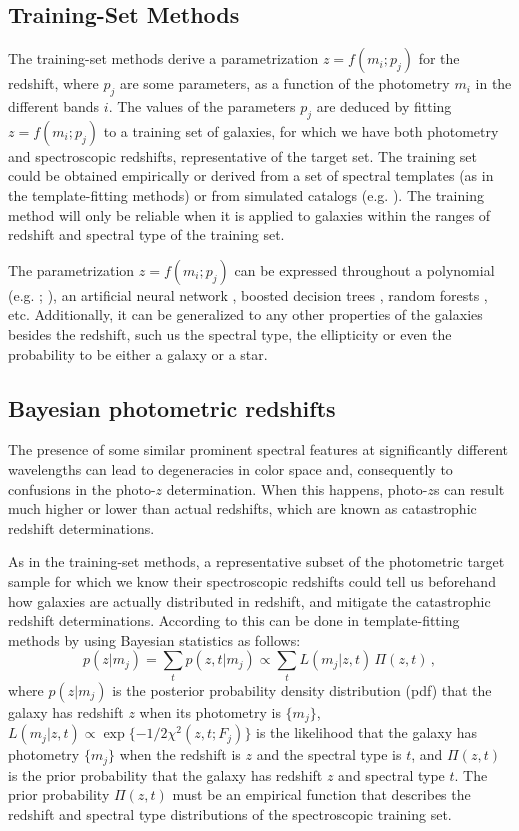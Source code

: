 \subsection{Training-Set Methods}
The training-set methods derive a parametrization $z=f(m_i;p_j)$ for the redshift, where $p_j$ are some parameters, as a function of the photometry $m_i$ in the different bands $i$. The values of the parameters $p_j$ are deduced by fitting $z=f(m_i;p_j)$ to a training set of galaxies, for which we have both photometry and spectroscopic redshifts, representative of the target set. The training set could be obtained empirically or derived from a set of spectral templates (as in the template-fitting methods) or from simulated catalogs (e.g. \citet{Vanzella2004}). The training method will only be reliable when it is applied to galaxies within the ranges of redshift and spectral type of the training set. 

The parametrization $z=f(m_i;p_j)$ can be expressed throughout a polynomial (e.g. \citet{Connolly1995}; \citet{Sowards-Emmerd2000}), an artificial neural network \citep{Collister2004}, boosted decision trees \citep{Gerdes2010}, random forests \citep{Carliles2010}, etc. Additionally, it can be generalized to any other properties of the galaxies besides the redshift, such us the spectral type, the ellipticity or even the probability to be either a galaxy or a star.

\subsection{Bayesian photometric redshifts}
The presence of some similar prominent spectral features at significantly different wavelengths can lead to degeneracies in color space and, consequently to confusions in the photo-$z$ determination. When this happens, photo-$z$s can result much higher or lower than actual redshifts, which are known as catastrophic redshift determinations.  

As in the training-set methods, a representative subset of the photometric target sample for which we know their spectroscopic redshifts could tell us beforehand how galaxies are actually distributed in redshift, and mitigate the catastrophic redshift determinations. According to \citet{Benitez2000} this can be done in template-fitting methods by using Bayesian statistics as follows:
\begin{equation}
p(z|m_j) = \sum_t p(z,t|m_j) \propto \sum_t L(m_j|z,t) \, \Pi(z,t)  \, ,
\label{pz_intro}
\end{equation}
where $p(z|m_j)$ is the posterior probability density distribution (pdf) that the galaxy has redshift $z$ when its photometry is $\lbrace m_j \rbrace$, $L(m_j|z,t) \propto \exp \lbrace -1/2 \chi^2(z,t; F_j) \rbrace$ is the likelihood that the galaxy has photometry $\lbrace m_j \rbrace$ when the redshift is $z$ and the spectral type is $t$, and $\Pi(z,t)$ is the prior probability that the galaxy has redshift $z$ and spectral type $t$. The prior probability $\Pi(z,t)$ must be an empirical function that describes the redshift and spectral type distributions of the spectroscopic training set. 

